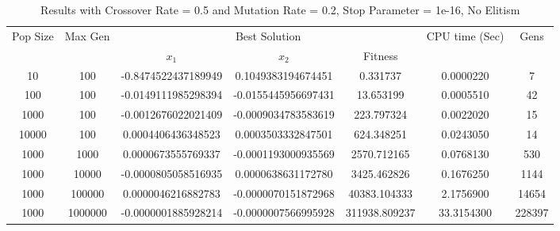 \documentclass[12pt]{article}
\begin{document}
    \begin{table}[h!]
        \small
		\caption{Results with Crossover Rate = 0.5 and Mutation Rate = 0.2, Stop Parameter = 1e-16, No Elitism}
		\label{table:1}
		\centering
		\begin{tabular}{c c c c c c c}
			\hline
			Pop Size & Max Gen & \multicolumn{3}{c}{Best Solution} & CPU time (Sec) & Gens \\
			& & $x_1$ & $x_2$ & Fitness & \\
			\hline
			10    & 100  & -0.8474522437189949 & 0.1049383194674451  & 0.331737     & 0.0000220 & 7 \\
			100   & 100  & -0.0149111985298394 & -0.0155445956697431 & 13.653199    & 0.0005510 & 42 \\
			1000  & 100  & -0.0012676022021409 & -0.0009034783583619 & 223.797324   & 0.0022020 & 15 \\
			10000 & 100  & 0.0004406436348523  & 0.0003503332847501  & 624.348251   & 0.0243050 & 14 \\
			\hline
			1000 & 1000    & 0.0000673555769337  & -0.0001193000935569 & 2570.712165   & 0.0768130 & 530 \\
			1000 & 10000   & -0.0000805058516935 & 0.0000638631172780  & 3425.462826   & 0.1676250 & 1144 \\
			1000 & 100000  & 0.0000046216882783  & -0.0000070151872968 & 40383.104333  & 2.1756900 & 14654 \\
			1000 & 1000000 & -0.0000001885928214 & -0.0000007566995928 & 311938.809237 & 33.3154300 & 228397 \\
			\hline
		\end{tabular}
	\end{table}
	
\end{document}

